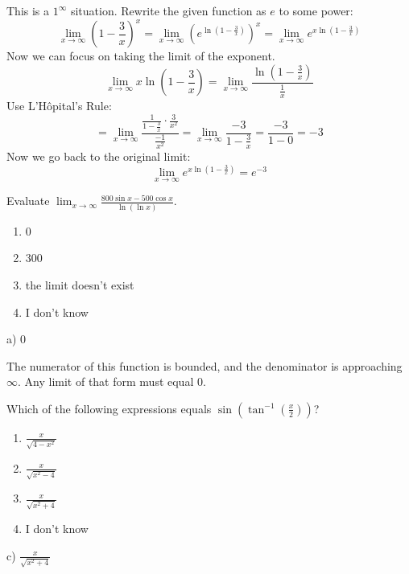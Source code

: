 \documentclass[addpoints,12pt,answers]{exam}
\begin{document}
\begin{questions}
\begin{solution}
    This is a $1^\infty$ situation. Rewrite the given function as $e$ to some power:
    $$\lim_{x\to\infty}\left(1-\frac{3}{x}\right)^x=\lim_{x\to\infty}\left(e^{\ln(1-\frac{3}{x})}\right)^x=\lim_{x\to\infty}e^{x\ln(1-\frac{3}{x})}$$
    Now we can focus on taking the limit of the exponent.
    $$\lim_{x\to\infty}x\ln\left(1-\frac{3}{x}\right)=\lim_{x\to\infty}\frac{\ln\left(1-\frac{3}{x}\right)}{\frac{1}{x}}$$
    Use L'H\^{o}pital's Rule:
    $$=\lim_{x\to\infty}\frac{\frac{1}{1-\frac{3}{x}}\cdot\frac{3}{x^2}}{\frac{-1}{x^2}}=\lim_{x\to\infty}\frac{-3}{1-\frac{3}{x}}=\frac{-3}{1-0}=-3$$
    Now we go back to the original limit:
    $$\lim_{x\to\infty}e^{x\ln(1-\frac{3}{x})}=e^{-3}$$
  \end{solution}
  \newpage
  \question
  Evaluate $\displaystyle\lim_{x\to\infty}\frac{800\sin x-500\cos x}{\ln(\ln x)}$.
  \begin{enumerate}[label=\alph*)]
    \item
    0
    \item
    300
    \item
    the limit doesn't exist
    \item
    I don't know
  \end{enumerate}
  \begin{solution}
    a) 0
    
    The numerator of this function is bounded, and the denominator is approaching $\infty$. Any limit of that form must equal 0.
  \end{solution}
  \newpage
  \question
  Which of the following expressions equals $\displaystyle\sin\left(\tan^{-1}\left(\frac{x}{2}\right)\right)$?
  \begin{enumerate}[label=\alph*)]
    \item
    $\displaystyle\frac{x}{\sqrt{4-x^2}}$
    \item
    $\displaystyle\frac{x}{\sqrt{x^2-4}}$
    \item
    $\displaystyle\frac{x}{\sqrt{x^2+4}}$
    \item
    I don't know
  \end{enumerate}
  \begin{solution}
    c) $\displaystyle\frac{x}{\sqrt{x^2+4}}$
    

\end{solution}
\end{questions}
\end{document}
